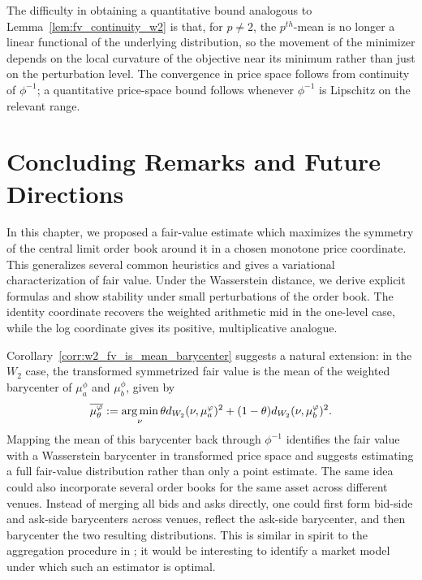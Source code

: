 The difficulty in obtaining a quantitative bound analogous to Lemma~\ref{lem:fv_continuity_w2}
is that, for $p \neq 2$, the $p^{th}$-mean is no longer a linear functional of the
underlying distribution, so the movement of the minimizer depends on the local
curvature of the objective near its minimum rather than just on the perturbation level.
The convergence in price space follows from continuity of $\phi^{-1}$; a quantitative price-space bound follows whenever $\phi^{-1}$ is Lipschitz on the relevant range.


\section{Concluding Remarks and Future Directions}

\noindent In this chapter, we proposed a fair-value estimate which maximizes the
symmetry of the central limit order book around it in a chosen monotone price coordinate. This generalizes several
common heuristics and gives a variational characterization of fair value. Under
the Wasserstein distance, we derive explicit formulas and show stability under
small perturbations of the order book. The identity coordinate recovers the weighted arithmetic mid in the one-level case, while the log coordinate gives its positive, multiplicative analogue.

Corollary~\ref{corr:w2_fv_is_mean_barycenter} suggests a natural extension: in
the $W_2$ case, the transformed symmetrized fair value is the mean of the weighted
barycenter of $\mu_a^\phi$ and $\mu_b^\phi$, given by
%
    \[\overline{\mu_\theta^\phi} := \argmin_{\nu}
\theta d_{W_2}(\nu,\mu_a^\phi)^2+(1-\theta)d_{W_2}(\nu,\mu_b^\phi)^2.\]
%
Mapping the mean of this barycenter back through $\phi^{-1}$ identifies the fair value with a Wasserstein barycenter in transformed price space and suggests
estimating a full fair-value distribution rather than only a point estimate. The
same idea could also incorporate several order books for the same asset across
different venues. Instead of merging all bids and asks directly, one could first
form bid-side and ask-side barycenters across venues, reflect the ask-side
barycenter, and then barycenter the two resulting distributions. This is similar
in spirit to the aggregation procedure in \cite{raban2024_aggregate_ratings_wasserstein_barycenters};
it would be interesting to identify a market model under which such an estimator
is optimal.

